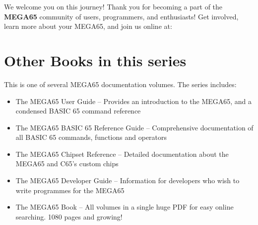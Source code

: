 We welcome you on this journey! Thank you for becoming a part of the {\bf MEGA65}
community of users, programmers, and enthusiasts! Get involved, learn more
about your MEGA65, and join us online at:


\section{Other Books in this series}

This is one of several MEGA65 documentation volumes.  The series includes:

\begin{itemize}
	\item The MEGA65 User Guide -- Provides an introduction to the MEGA65, and a condensed BASIC 65 command reference
	\item The MEGA65 BASIC 65 Reference Guide -- Comprehensive documentation of all BASIC 65 commands, functions and operators
	\item The MEGA65 Chipset Reference -- Detailed documentation about the MEGA65 and C65's custom chips
	\item The MEGA65 Developer Guide -- Information for developers who wish to write programmes for the MEGA65
	\item The MEGA65 Book -- All volumes in a single huge PDF for easy online searching. 1080 pages and growing!
\end{itemize}
